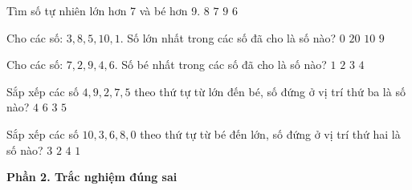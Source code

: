 \begin{ex} %
Tìm số tự nhiên lớn hơn 7 và bé hơn 9.
\choice
{\True $8$}
{$7$}
{$9$}
{$6$}
\end{ex}

\begin{ex} %
Cho các số: $3, 8, 5, 10, 1$. Số lớn nhất trong các số đã cho là số nào?
\choice
{$0$}
{$20$}
{\True $10$}
{$9$}
\end{ex}

\begin{ex} %
Cho các số: $7, 2, 9, 4, 6$. Số bé nhất trong các số đã cho là số nào?
\choice
{$1$}
{\True $2$}
{$3$}
{$4$}
\end{ex}

\begin{ex} %
Sắp xếp các số $4, 9, 2, 7, 5$ theo thứ tự từ lớn đến bé, số đứng ở vị trí thứ ba là số nào?
\choice
{$4$}
{$6$}
{$3$}
{\True $5$}
\end{ex}

\begin{ex} %
Sắp xếp các số $10, 3, 6, 8, 0$ theo thứ tự từ bé đến lớn, số đứng ở vị trí thứ hai là số nào?
\choice
{\True $3$}
{$2$}
{$4$}
{$1$}
\end{ex}

\textbf{Phần 2. Trắc nghiệm đúng sai}

